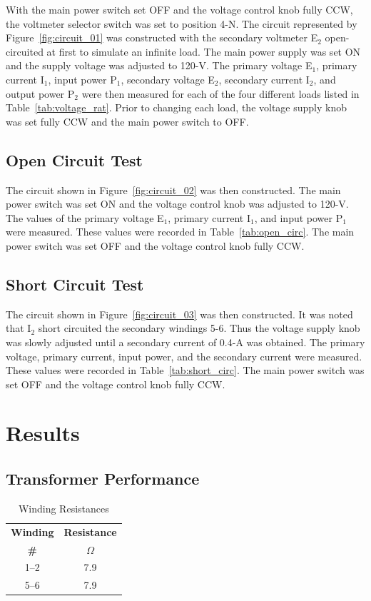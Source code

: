 \documentclass{article}
\begin{document}
\label{part1} With the main power switch set OFF and the voltage control knob fully CCW,
the voltmeter selector switch was set to position 4-N. The circuit represented by Figure~\ref{fig:circuit_01}
was constructed with the secondary voltmeter E$_2$ open-circuited at first to simulate an infinite load. 
The main power supply was set ON and the supply voltage was adjusted to 120-V. The primary
voltage E$_1$, primary current I$_1$, input power P$_1$, secondary voltage E$_2$, secondary current I$_2$, and
output power P$_2$ were then measured for each of the four different loads listed in Table~\ref{tab:voltage_rat}.
Prior to changing each load, the voltage supply knob was set fully CCW and the main power switch
to OFF.

\subsection{Open Circuit Test}

\label{part2} The circuit shown in Figure~\ref{fig:circuit_02} was then constructed. The main power switch
was set ON and the voltage control knob was adjusted to 120-V. The values of the primary voltage E$_1$, primary
current I$_1$, and input power P$_1$ were measured. These values were recorded in Table~\ref{tab:open_circ}.
The main power switch was set OFF and the voltage control knob fully CCW.

\subsection{Short Circuit Test}

\label{part3} The circuit shown in Figure~\ref{fig:circuit_03} was then constructed. It was noted that 
I$_2$ short circuited the secondary windings 5-6. Thus the voltage supply knob was slowly adjusted until
a secondary current of 0.4-A was obtained. The primary voltage, primary current, input power, and the 
secondary current were measured. These values were recorded in Table~\ref{tab:short_circ}.
The main power switch was set OFF and the voltage control knob fully CCW.


\section{Results}
\subsection{Transformer Performance}
\begin{table}[H]
  \centering
  \begin{tabular}{*{2}{c}}
    \textbf{Winding} & \textbf{Resistance} \\
    \textbf{\#} & $\Omega$ \\
    \hline
    1--2 &  7.9 \\
    5--6 &  7.9 \\
  \end{tabular}
  \caption{Winding Resistances}
  \label{tab:wind_res}
\end{table}
\end{document}

